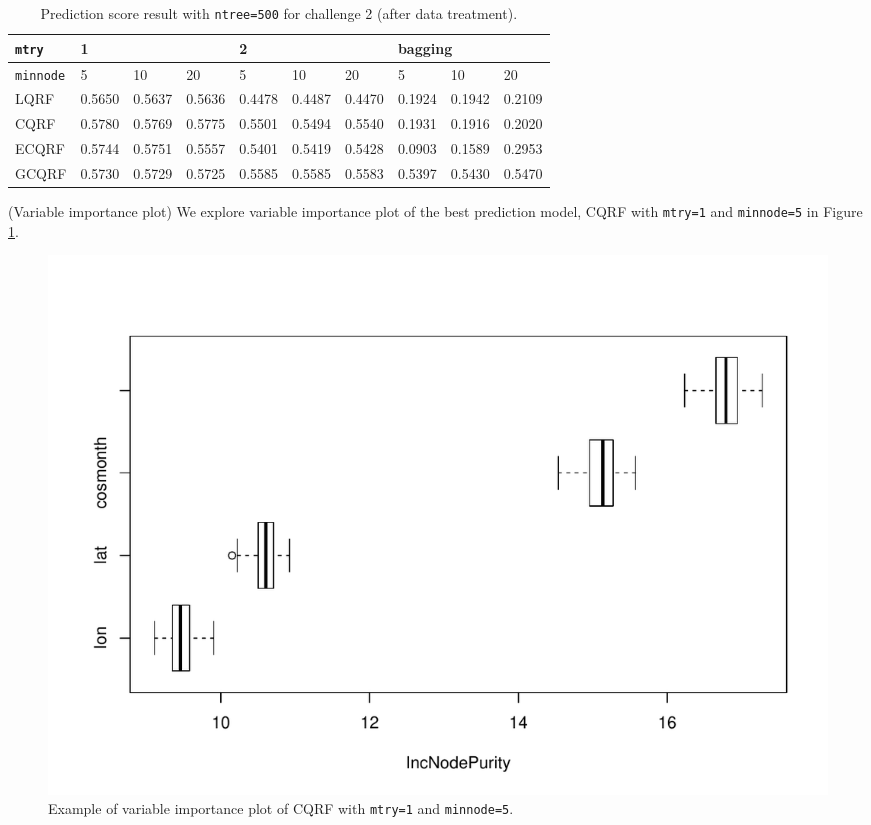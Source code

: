 \documentclass[11pt,titlepage]{article}
\begin{document}
	\begin{table}[]
		\centering
		\begin{tabular}{|l|l|l|l|l|l|l|l|l|l|}
			\hline
			\texttt{mtry} & \multicolumn{3}{l|}{1} & \multicolumn{3}{l|}{2} & \multicolumn{3}{l|}{bagging} \\ \hline
			\texttt{minnode}          & 5       & 10      & 20      & 5       & 10      & 20      & 5       & 10      & 20      \\ \hline
			LQRF	& 0.5650	& 0.5637	& 0.5636	& 0.4478	& 0.4487	& 0.4470	& 0.1924	& 0.1942	& 0.2109\\ \hline
			CQRF   &  $\mathbf{0.5780}$       &    0.5769   &    0.5775     &   0.5501      &   0.5494     &      0.5540    &     0.1931    &    0.1916   &  0.2020 \\ \hline
			ECQRF &  0.5744      &   0.5751  &  0.5557     &  0.5401      & 0.5419       &   0.5428      &     0.0903   &    0.1589     & 0.2953 \\ \hline
			GCQRF &   0.5730     &   0.5729      &   0.5725     &      0.5585    &   0.5585     &   0.5583     &  0.5397       &    0.5430   &  0.5470 \\ \hline
		\end{tabular}
		\caption{Prediction score result with \texttt{ntree=500} for challenge 2 (after data treatment).}
		\label{table:challenge2}
	\end{table}

(Variable importance plot) We explore variable importance plot of the best prediction model, CQRF with \texttt{mtry=1} and \texttt{minnode=5} in Figure \ref{fig:varimp}.
	
	\begin{figure}[h!]
		\centering
		\includegraphics[scale=0.75]{VI.pdf}
		\caption{Example of variable importance plot of CQRF with \texttt{mtry=1} and \texttt{minnode=5}.}
		\label{fig:varimp}
	\end{figure}
\end{document}
